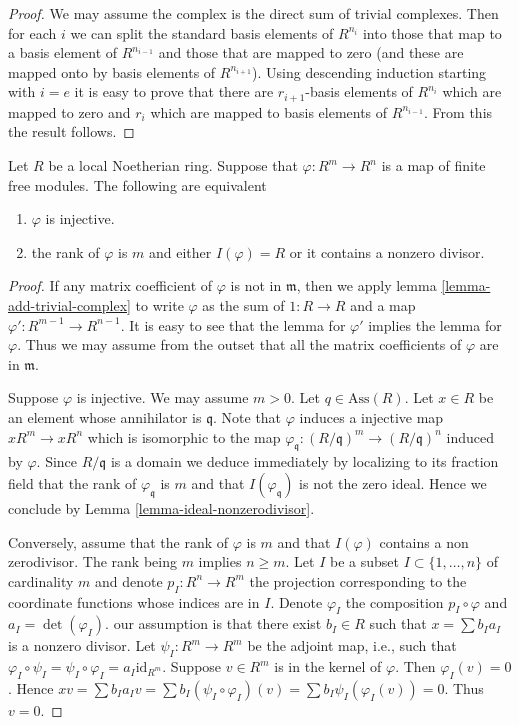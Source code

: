 \begin{proof}
We may assume the complex is the direct sum of trivial
complexes. Then for each $i$ we can split the standard basis
elements of $R^{n_i}$ into those that map to a basis element
of $R^{n_{i-1}}$ and those that are mapped to zero (and these
are mapped onto by basis elements of $R^{n_{i + 1}}$).
Using descending
induction starting with $i = e$ it is easy to prove that there
are $r_{i + 1}$-basis elements of $R^{n_i}$ which are mapped
to zero and $r_i$ which are mapped to basis elements of
$R^{n_{i-1}}$. From this the result follows.
\end{proof}

\begin{lemma}
\label{lemma-exact-length-1}
Let $R$ be a local Noetherian ring.
Suppose that $\varphi : R^m \to R^n$ is a map
of finite free modules. The following are equivalent
\begin{enumerate}
\item $\varphi$ is injective.
\item the rank of $\varphi$ is $m$ and
either $I(\varphi) = R$ or it contains a nonzero divisor.
\end{enumerate}
\end{lemma}

\begin{proof}
If any matrix coefficient of $\varphi$ is not in $\mathfrak m$,
then we apply lemma \ref{lemma-add-trivial-complex} to write
$\varphi$ as the sum of $1 : R \to R$ and a map
$\varphi' : R^{m-1} \to R^{n-1}$. It is easy to see that
the lemma for $\varphi'$ implies the lemma for $\varphi$.
Thus we may assume from the outset that all the matrix
coefficients of $\varphi$ are in $\mathfrak m$.

\medskip\noindent
Suppose $\varphi$ is injective. We may assume $m > 0$.
Let $q \in \text{Ass}(R)$. Let $x \in R$ be an element
whose annihilator is $\mathfrak q$. Note that $\varphi$
induces a injective map $xR^m \to xR^n$ which is isomorphic
to the map $\varphi_{\mathfrak q} : (R/\mathfrak q)^m \to (R/\mathfrak q)^n$
induced by $\varphi$. Since $R/\mathfrak q$ is a domain
we deduce immediately by localizing to its fraction field
that the rank of $\varphi_{\mathfrak q}$ is $m$ and that
$I(\varphi_{\mathfrak q})$ is not the zero ideal. Hence we
conclude by Lemma \ref{lemma-ideal-nonzerodivisor}.

\medskip\noindent
Conversely, assume that the rank of $\varphi$ is $m$
and that $I(\varphi)$ contains a non zerodivisor.
The rank being $m$ implies $n \geq m$. Let $I$ be
a subset $I \subset \{1, \ldots, n\}$ of cardinality
$m$ and denote $p_I : R^{n} \to R^m$ the projection
corresponding to the coordinate functions whose indices
are in $I$. Denote $\varphi_I$ the composition
$p_I \circ \varphi$ and $a_I = \det(\varphi_I)$.
our assumption is that there exist $b_I \in R$ such
that $x = \sum b_I a_I$ is a nonzero divisor.
Let $\psi_I : R^m \to R^m$ be the adjoint map, i.e.,
such that $\varphi_I \circ \psi_I = \psi_I \circ \varphi_I =
a_I \text{id}_{R^m}$. Suppose $v \in R^m$ is in the kernel of $\varphi$.
Then $\varphi_I(v) = 0$. Hence $xv = \sum b_I a_I v
= \sum b_I (\psi_I \circ \varphi_I)(v)
= \sum b_I \psi_I(\varphi_I(v)) = 0$. Thus $v = 0$.
\end{proof}

